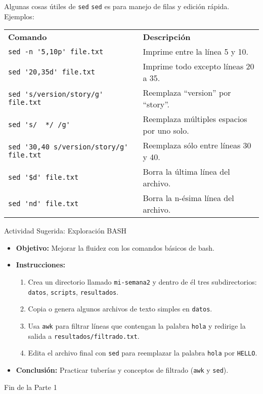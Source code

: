\documentclass[10pt]{beamer}
\begin{document}
\begin{frame}[fragile]{Algunas cosas útiles de \texttt{sed}}
\texttt{sed} es para manejo de filas y edición rápida.  
Ejemplos:
\begin{table}\footnotesize
\begin{tabular}{ll}
\textbf{Comando} & \textbf{Descripción} \\
\verb|sed -n '5,10p' file.txt| & Imprime entre la línea 5 y 10. \\
\verb|sed '20,35d' file.txt| & Imprime todo excepto líneas 20 a 35. \\
\verb|sed 's/version/story/g' file.txt| & Reemplaza “version” por “story”. \\
\verb|sed 's/  */ /g'| & Reemplaza múltiples espacios por uno solo. \\
\verb|sed '30,40 s/version/story/g' file.txt| & Reemplaza sólo entre líneas 30 y 40. \\
\verb|sed '$d' file.txt| & Borra la última línea del archivo. \\
\verb|sed 'nd' file.txt| & Borra la n-ésima línea del archivo.
\end{tabular}
\end{table}
\end{frame}


\begin{frame}{Actividad Sugerida: Exploración BASH}
\begin{itemize}
    \item \textbf{Objetivo:} Mejorar la fluidez con los comandos básicos de bash.
    \item \textbf{Instrucciones:}
    \begin{enumerate}
        \item Crea un directorio llamado \texttt{mi-semana2} y dentro de él tres subdirectorios: \texttt{datos}, \texttt{scripts}, \texttt{resultados}.
        \item Copia o genera algunos archivos de texto simples en \texttt{datos}.
        \item Usa \texttt{awk} para filtrar líneas que contengan la palabra \texttt{hola} y redirige la salida a \texttt{resultados/filtrado.txt}.
        \item Edita el archivo final con \texttt{sed} para reemplazar la palabra \texttt{hola} por \texttt{HELLO}.
    \end{enumerate}
    \item \textbf{Conclusión:} Practicar tuberías y conceptos de filtrado (\texttt{awk} y \texttt{sed}).
\end{itemize}
\end{frame}

\begin{frame}
\Huge{\centerline{Fin de la Parte 1}}
\end{frame}
\end{document}
